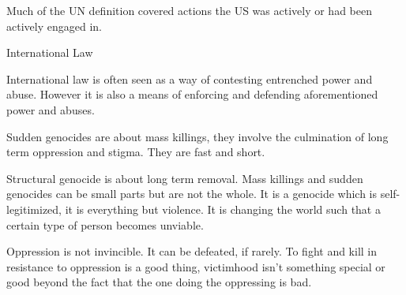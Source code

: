 \documentclass{report}
\begin{document}
\begin{description}
\begin{mdframed}
        Much of the UN definition covered actions the US was
        actively or had been actively engaged in.
    \end{mdframed}
    \item {\large International Law}
        \begin{mdframed}
            International law is often seen as a way of
            contesting entrenched power and abuse. However
            it is also a means of enforcing and defending
            aforementioned power and abuses.
        \end{mdframed}
        \begin{mdframed}
            Sudden genocides are about mass killings, they
            involve the culmination of long term oppression
            and stigma. They are fast and short.
        \end{mdframed}
        \begin{mdframed}
            Structural genocide is about long term
            removal. Mass killings and sudden genocides can
            be small parts but are not the whole. It is
            a genocide which is self-legitimized, it is
            everything but violence. It is changing the
            world such that a certain type of person becomes
            unviable.

            Oppression is not invincible. It can be defeated,
            if rarely. To fight and kill in resistance
            to oppression is a good thing, victimhood isn't
            something special or good beyond the fact that
            the one doing the oppressing is bad.
        \end{mdframed}
    \item {\large}
\end{description}
\end{document}
